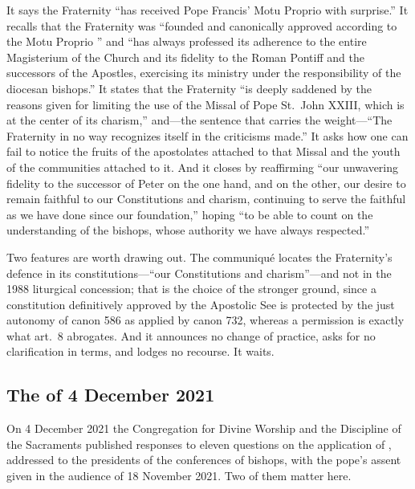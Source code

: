 It says the Fraternity ``has received Pope Francis' Motu Proprio
 with surprise.'' It recalls that the
Fraternity was ``founded and canonically approved according to the Motu
Proprio '' and ``has always professed its
adherence to the entire Magisterium of the Church and its fidelity to the
Roman Pontiff and the successors of the Apostles, exercising its ministry
under the responsibility of the diocesan bishops.'' It states that the
Fraternity ``is deeply saddened by the reasons given for limiting the use
of the Missal of Pope St.\ John XXIII, which is at the center of its
charism,'' and---the sentence that carries the weight---``The Fraternity in
no way recognizes itself in the criticisms made.'' It asks how one can
fail to notice the fruits of the apostolates attached to that Missal and
the youth of the communities attached to it. And it closes by reaffirming
``our unwavering fidelity to the successor of Peter on the one hand, and
on the other, our desire to remain faithful to our Constitutions and
charism, continuing to serve the faithful as we have done since our
foundation,'' hoping ``to be able to count on the understanding of the
bishops, whose authority we have always respected.''

Two features are worth drawing out. The communiqué locates the
Fraternity's defence in its constitutions---``our Constitutions and
charism''---and not in the 1988 liturgical concession; that is the choice
of the stronger ground, since a constitution definitively approved by the
Apostolic See is protected by the just autonomy of canon 586 as applied by
canon 732, whereas a permission is exactly what art.~8 abrogates. And it
announces no change of practice, asks for no clarification in terms, and
lodges no recourse. It waits.

\subsection{The  of 4 December 2021}

On 4 December 2021 the Congregation for Divine Worship and the Discipline
of the Sacraments published responses to eleven questions on the
application of , addressed to the presidents of
the conferences of bishops, with the pope's assent given in the audience
of 18 November 2021. Two of them matter here.

